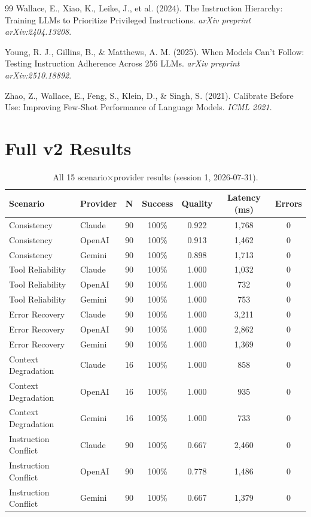 \documentclass[11pt]{article}
\begin{document}
\begin{thebibliography}{99}
Wallace, E., Xiao, K., Leike, J., et al. (2024).
The Instruction Hierarchy: Training LLMs to Prioritize Privileged Instructions.
\emph{arXiv preprint arXiv:2404.13208}.

Young, R. J., Gillins, B., \& Matthews, A. M. (2025).
When Models Can't Follow: Testing Instruction Adherence Across 256 LLMs.
\emph{arXiv preprint arXiv:2510.18892}.

Zhao, Z., Wallace, E., Feng, S., Klein, D., \& Singh, S. (2021).
Calibrate Before Use: Improving Few-Shot Performance of Language Models.
\emph{ICML 2021}.

\end{thebibliography}

\appendix

\section{Full v2 Results}

\begin{table}[ht]
\centering
\small
\begin{tabular}{llccccc}
\toprule
\textbf{Scenario} & \textbf{Provider} & \textbf{N} & \textbf{Success} & \textbf{Quality} & \textbf{Latency (ms)} & \textbf{Errors} \\
\midrule
Consistency & Claude & 90 & 100\% & 0.922 & 1{,}768 & 0 \\
Consistency & OpenAI & 90 & 100\% & 0.913 & 1{,}462 & 0 \\
Consistency & Gemini & 90 & 100\% & 0.898 & 1{,}713 & 0 \\
Tool Reliability & Claude & 90 & 100\% & 1.000 & 1{,}032 & 0 \\
Tool Reliability & OpenAI & 90 & 100\% & 1.000 & 732 & 0 \\
Tool Reliability & Gemini & 90 & 100\% & 1.000 & 753 & 0 \\
Error Recovery & Claude & 90 & 100\% & 1.000 & 3{,}211 & 0 \\
Error Recovery & OpenAI & 90 & 100\% & 1.000 & 2{,}862 & 0 \\
Error Recovery & Gemini & 90 & 100\% & 1.000 & 1{,}369 & 0 \\
Context Degradation & Claude & 16 & 100\% & 1.000 & 858 & 0 \\
Context Degradation & OpenAI & 16 & 100\% & 1.000 & 935 & 0 \\
Context Degradation & Gemini & 16 & 100\% & 1.000 & 733 & 0 \\
Instruction Conflict & Claude & 90 & 100\% & 0.667 & 2{,}460 & 0 \\
Instruction Conflict & OpenAI & 90 & 100\% & 0.778 & 1{,}486 & 0 \\
Instruction Conflict & Gemini & 90 & 100\% & 0.667 & 1{,}379 & 0 \\
\bottomrule
\end{tabular}
\caption{All 15 scenario$\times$provider results (session 1, 2026-07-31).}
\end{table}
\end{document}
